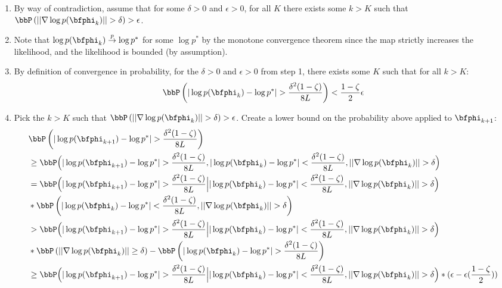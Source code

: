 \begin{enumerate}
    \item By way of contradiction, assume that for some $\delta > 0$ and $\epsilon > 0$, for all $K$ there exists some $k > K$ such that $\bbP \left(||\nabla \log p(\bfphi_k)|| > \delta \right) > \epsilon$.
    \item Note that $\log p(\bfphi_k)\overset{p}{\to} \log p^*$ for some $\log p^*$ by the monotone convergence theorem since the map strictly increases the likelihood, and the likelihood is bounded (by assumption).
    \item By definition of convergence in probability, for the $\delta > 0$ and $\epsilon > 0$ from step 1, there exists some $K$ such that for all $k > K$:
    $$\bbP\left(|\log p(\bfphi_{k}) - \log p^*| > \frac{\delta^2(1-\zeta)}{8L}\right) < \frac{1-\zeta}{2}\epsilon$$
    \item Pick the $k > K$ such that $\bbP \left(||\nabla \log p(\bfphi_k)|| > \delta \right) > \epsilon$. Create a lower bound on the probability above applied to $\bfphi_{k+1}$:
    \begin{align*}
        &\bbP\left(|\log p(\bfphi_{k+1}) - \log p^*| > \frac{\delta^2(1-\zeta)}{8L}\right) \\ 
        &\geq \bbP\Big(|\log p(\bfphi_{k+1}) - \log p^*| > \frac{\delta^2(1-\zeta)}{8L}, |\log p(\bfphi_k) - \log p^*| < \frac{\delta^2(1-\zeta)}{8L}, ||\nabla \log p(\bfphi_k)|| > \delta \Big) \\
        &= \bbP\Big(|\log p(\bfphi_{k+1}) - \log p^*| > \frac{\delta^2(1-\zeta)}{8L} \Big| |\log p(\bfphi_k) - \log p^*| < \frac{\delta^2(1-\zeta)}{8L}, ||\nabla \log p(\bfphi_k)|| > \delta \Big) \\
        & * \bbP\left( |\log p(\bfphi_k) - \log p^*| < \frac{\delta^2(1-\zeta)}{8L}, ||\nabla \log p(\bfphi_k)|| > \delta \right) \\ 
        & > \bbP\Big(|\log p(\bfphi_{k+1}) - \log p^*| > \frac{\delta^2(1-\zeta)}{8L} \Big| |\log p(\bfphi_k) - \log p^*| < \frac{\delta^2(1-\zeta)}{8L}, ||\nabla \log p(\bfphi_k)|| > \delta \Big) \\
        & * \bbP \left(||\nabla \log p(\bfphi_k)|| \geq \delta \right) - \bbP\left( |\log p(\bfphi_k) - \log p^*| > \frac{\delta^2(1-\zeta)}{8L}\right) \\
        & \geq \bbP\Big(|\log p(\bfphi_{k+1}) - \log p^*| > \frac{\delta^2(1-\zeta)}{8L} \Big| |\log p(\bfphi_k) - \log p^*| < \frac{\delta^2(1-\zeta)}{8L}, ||\nabla \log p(\bfphi_k)|| > \delta \Big) * (\epsilon - \epsilon(\frac{1-\zeta}{2})) \\

\end{align*}
\end{enumerate}
